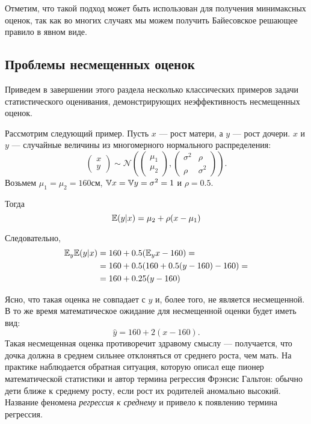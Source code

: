 Отметим, что такой подход может быть использован для получения минимаксных оценок, так как во многих случаях мы можем получить Байесовское решающее правило в явном виде.

\subsection{Проблемы несмещенных оценок}

Приведем в завершении этого раздела несколько классических примеров задачи статистического оценивания, демонстрирующих неэффективность несмещенных оценок.

\begin{example}
Рассмотрим следующий пример.
Пусть $x$ --- рост матери, а $y$ --- рост дочери.
$x$ и $y$ --- случайные величины из многомерного нормального распределения:
\[
\begin{pmatrix}
x \\ y
\end{pmatrix} \sim
\mathcal{N}
\left( 
\begin{pmatrix}
\mu_1 \\ \mu_2
\end{pmatrix},
\begin{pmatrix}
\sigma^2 & \rho \\ \rho & \sigma^2
\end{pmatrix}
\right).
\]
Возьмем $\mu_1 = \mu_2 = 160 \text{см}$, $\mathbb{V} x = \mathbb{V} y = \sigma^2 = 1$ и $\rho = 0.5$.

Тогда 
\[
\mathbb{E} (y | x) = \mu_2 + \rho (x - \mu_1)
\]

Следовательно,
\begin{align*}
\mathbb{E}_y \mathbb{E} (y | x) &= 160 + 0.5 (\mathbb{E}_y x - 160) = \\
                    &= 160 + 0.5 (160 + 0.5(y - 160) - 160) = \\
                    &= 160 + 0.25 (y - 160)
\end{align*}

Ясно, что такая оценка не совпадает с $y$ и, более того, не является несмещенной.
В то же время математическое ожидание для несмещенной оценки будет иметь вид:
\[
\hat{y} = 160 + 2 (x - 160).
\]
Такая несмещенная оценка противоречит здравому смыслу ---
получается, что дочка должна в среднем сильнее отклоняться от среднего роста, чем мать.
На практике наблюдается обратная ситуация, которую описал еще пионер математической статистики и автор термина регрессия Фрэнсис Гальтон:
обычно дети ближе к среднему росту, если рост их родителей аномально высокий.
Название феномена \emph{регрессия к среднему} и привело к появлению термина регрессия.

\end{example}

